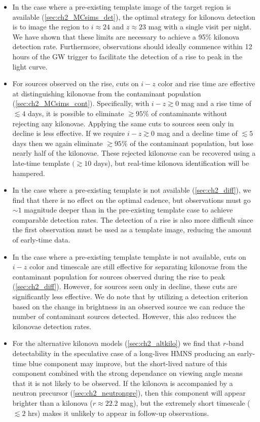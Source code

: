 \begin{itemize}
\item In the case where a pre-existing template image of the target region is available (\autoref{sec:ch2_MCsims_det}), the optimal strategy for kilonova detection is to image the region to $i\approx 24$ and $z\approx 23$ mag with a single visit per night. We have shown that these limits are necessary to achieve a 95\% kilonova detection rate. Furthermore, observations should ideally commence within 12 hours of the GW trigger to facilitate the detection of a rise to peak in the light curve.
\item For sources observed on the rise, cuts on $i-z$ color and rise time are effective at distinguishing kilonovae from the contaminant population (\autoref{sec:ch2_MCsims_cont}). Specifically, with $i-z\gtrsim0$ mag and a rise time of $\lesssim 4$ days, it is possible to eliminate $\gtrsim95\%$ of contaminants without rejecting any kilonovae. Applying the same cuts to sources seen only in decline is less effective. If we require $i-z\gtrsim0$ mag and a decline time of $\lesssim5$ days then we again eliminate $\gtrsim95\%$ of the contaminant population, but lose nearly half of the kilonovae. These rejected kilonovae can be recovered using a late-time template $(\gtrsim10$ days), but real-time kilonova identification will be hampered.
\item In the case where a pre-existing template is not available (\autoref{sec:ch2_diff}), we find that there is no effect on the optimal cadence, but observations must go $\sim1$ magnitude deeper than in the pre-existing template case to achieve comparable detection rates. The detection of a rise is also more difficult since the first observation must be used as a template image, reducing the amount of early-time data.
\item In the case where a pre-existing template template is not available, cuts on $i-z$ color and timescale are still effective for separating kilonovae from the contaminant population for sources observed during the rise to peak (\autoref{sec:ch2_diff}). However, for sources seen only in decline, these cuts are significantly less effective. We do note that by utilizing a detection criterion based on the change in brightness in an observed source we can reduce the number of contaminant sources detected. However, this also reduces the kilonovae detection rates.
\item For the alternative kilonova models (\autoref{sec:ch2_altkilo}) we find that $r$-band detectability in the speculative case of a long-lives HMNS producing an early-time blue component may improve, but the short-lived nature of this component combined with the strong dependance on viewing angle means that it is not likely to be observed. If the kilonova is accompanied by a neutron precursor (\autoref{sec:ch2_neutronpre}), then this component will appear brighter than a kilonova ($r\approx22.2$ mag), but the extremely short timescale ($\lesssim2$ hrs) makes it unlikely to appear in follow-up observations.

\end{itemize}
